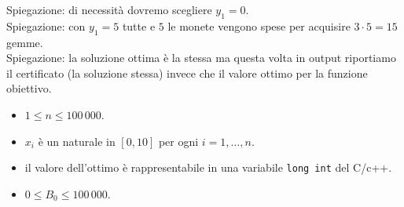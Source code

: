 Spiegazione: di necessità dovremo scegliere $y_1 = 0$.\\

Spiegazione: con $y_1 = 5$ tutte e $5$ le monete vengono spese per acquisire $3\cdot 5 = 15$ gemme.\\

Spiegazione: la soluzione ottima è la stessa ma questa volta in output riportiamo il certificato (la soluzione stessa) invece che il valore ottimo per la funzione obiettivo.\\






\begin{itemize}[nolistsep, noitemsep]
  \item $1 \le n \le 100\,000$.
  \item $x_i$ è un naturale in $[0, 10]$ per ogni $i=1,\ldots, n$.
  \item il valore dell'ottimo è rappresentabile in una variabile {\tt long int} del C/c++.
  \item $0 \le B_0 \le 100\,000$.
\end{itemize}
  
